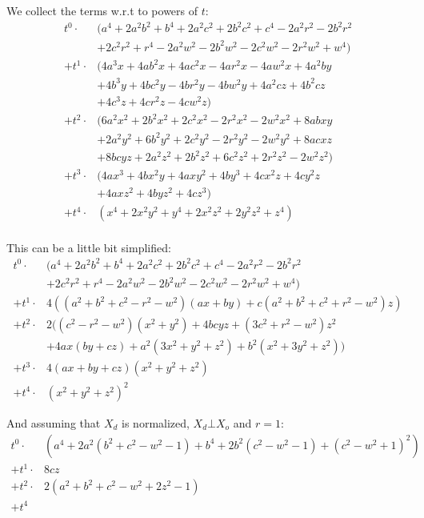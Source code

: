 \documentclass[12pt,a4paper,landscape]{amsart}
\numberwithin{equation}{section}
\theoremstyle{plain}
\theoremstyle{definition}
\begin{document}
We collect the terms w.r.t to powers of $t$:
\begin{align*}
   t^0 \cdot &( a^4+2 a^2 b^2+b^4+2 a^2 c^2+2 b^2 c^2+c^4-2 a^2 r^2-2 b^2 r^2 \\
             &+ 2 c^2 r^2+r^4-2 a^2 w^2-2 b^2 w^2-2 c^2 w^2-2 r^2 w^2+w^4) \\
  +t^1 \cdot &(4 a^3 x+4 a b^2 x+4 a c^2 x-4 a r^2 x-4 a w^2 x+4 a^2 b y \\
             &+4 b^3 y+4 b c^2 y-4 b r^2 y-4 b w^2 y+4 a^2 c z+4 b^2 c z \\
             &+4 c^3 z+4 c r^2 z-4 c w^2 z) \\
  +t^2 \cdot &(6 a^2 x^2+2 b^2 x^2+2 c^2 x^2-2 r^2 x^2-2 w^2 x^2+8 a b x y \\
             &+2 a^2 y^2+6 b^2 y^2+2 c^2 y^2-2 r^2 y^2-2 w^2 y^2+8 a c x z \\
             &+8 b c y z+2 a^2 z^2+2 b^2 z^2+6 c^2 z^2+2 r^2 z^2-2 w^2 z^2) \\
  +t^3 \cdot &(4 a x^3+4 b x^2 y+4 a x y^2+4 b y^3+4 c x^2 z+4 c y^2 z \\
             &+4 a x z^2+4 b y z^2+4 c z^3) \\
  +t^4 \cdot &(x^4+2 x^2 y^2+y^4+2 x^2 z^2+2 y^2 z^2+z^4)
\end{align*}\\

This can be a little bit simplified:
\begin{align*}
   t^0 \cdot &( a^4+2 a^2 b^2+b^4+2 a^2 c^2+2 b^2 c^2+c^4-2 a^2 r^2-2 b^2 r^2 \\
             &+ 2 c^2 r^2+r^4-2 a^2 w^2-2 b^2 w^2-2 c^2 w^2-2 r^2 w^2+w^4) \\
  +t^1 \cdot &4((a^2+b^2+c^2-r^2-w^2) (a x+b y)+c (a^2+b^2+c^2+r^2-w^2) z) \\
  +t^2 \cdot &2((c^2-r^2-w^2) (x^2+y^2)+4 b c y z+(3 c^2+r^2-w^2) z^2 \\
             &+4 a x (b y+c z)+a^2 (3 x^2+y^2+z^2)+b^2 (x^2+3 y^2+z^2)) \\
  +t^3 \cdot &4(a x+b y+c z) (x^2+y^2+z^2) \\
  +t^4 \cdot &(x^2+y^2+z^2)^2
\end{align*}

And assuming that $X_d$ is normalized, $X_d \bot X_o$ and $r = 1$:
\begin{align*}
   t^0 \cdot &\left(a^4+2 a^2 \left(b^2+c^2-w^2-1\right)+b^4+2 b^2 \left(c^2-w^2-1\right)+\left(c^2-w^2+1\right)^2\right) \\
  +t^1 \cdot &8 c z \\
  +t^2 \cdot &2 \left(a^2+b^2+c^2-w^2+2 z^2-1\right)\\
  +t^4  &
\end{align*}
\end{document}
